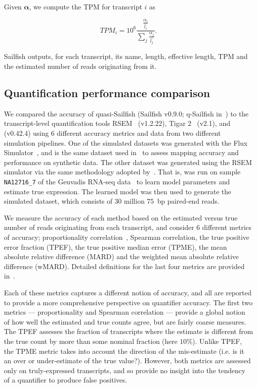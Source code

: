Given $\bm{\alpha}$, we compute the TPM for transcript $i$ as

\begin{equation}
  TPM_i = 10^6 \frac{\frac{\alpha_i}{\hat{l_i}}}{\sum_{j}\frac{\alpha_j}{\hat{l_j}}}.
\label{eqn:tpm}
\end{equation}

Sailfish outputs, for each transcript, its name, length, effective length, TPM and the estimated number of reads originating from it.

\subsection{Quantification performance comparison}
\label{subsec:quant_compare}

We compared the accuracy of quasi-Sailfish (Sailfish v0.9.0; q-Sailfish in~) to the transcript-level quantification tools RSEM~\citep{li2010rna} (v1.2.22), Tigar 2~\citep{tigar2} (v2.1), and \kallisto~\citep{kallisto} (v0.42.4) using 6 different accuracy metrics and data from two different simulation pipelines. One of the simulated datasets was generated with the Flux Simulator~\citep{fluxsim}, and is the same dataset used in~ to assess mapping accuracy and performance on synthetic data.  The other dataset was generated using the RSEM simulator via the same methodology adopted by~\citet{kallisto}.  That is,  was run on sample \texttt{NA12716\_7} of the Geuvadis RNA-seq data~\citep{Lappalainen2013Transcriptome} to learn model parameters and estimate true expression. The learned model was then used to generate the simulated dataset, which consists of $30$ million $75$~bp paired-end reads.

We measure the accuracy of each method based on the estimated versus true number of reads originating from each transcript, and consider 6 different metrics of accuracy; proportionality correlation~\citep{Lovell2015Proportionality}, Spearman correlation, the true positive error fraction (TPEF), the true positive median error (TPME), the mean absolute relative difference (MARD) and the weighted mean absolute relative difference (wMARD). Detailed definitions for the last four metrics are provided in~. 

Each of these metrics captures a different notion of accuracy, and all are reported to provide a more comprehensive perspective on quantifier accuracy.  The first two metrics --- proportionality and Spearman correlation --- provide a global notion of how well the estimated and true counts agree, but are fairly coarse measures. The TPEF assesses the fraction of transcripts where the estimate is different from the true count by more than some nominal fraction (here $10\%$).  Unlike TPEF, the TPME metric takes into account the direction of the mis-estimate (i.e. is it an over or under-estimate of the true value?).  However, both metrics are assessed only on truly-expressed transcripts, and so provide no insight into the tendency of a quantifier to produce false positives.

